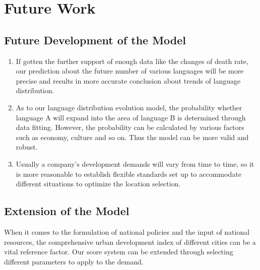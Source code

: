 \documentclass{mcmthesis}
\begin{document}
\section{Future Work}
\subsection{Future Development of the Model}
\begin{enumerate}[1]
\item If gotten the further support of enough data like the changes of death rate, our prediction about the future number of various languages will be more precise and results in more accurate conclusion about trends of language distribution. 
\item As to our language distribution evolution model, the probability whether language A will expand into the area of language B is determined through data fitting. However, the probability can be calculated by various factors such as economy, culture and so on. Thus the model can be more valid and robust. 
\item Usually a company's development demands will vary from time to time, so it is more reasonable to establish flexible standards set up to accommodate different situations to optimize the location selection. 
\end{enumerate}

\subsection{Extension of the Model}
When it comes to the formulation of national policies and the input of national resources, the comprehensive urban development index of different cities can be a vital reference factor. Our score system can be extended through selecting different parameters to apply to the demand. 
\end{document}
